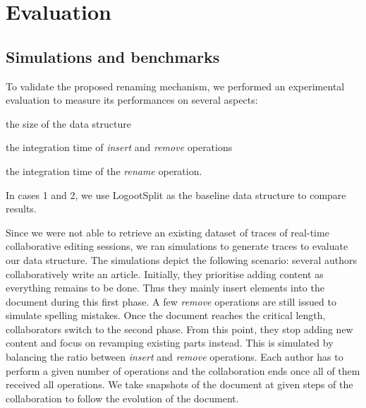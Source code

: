 \documentclass[sigplan,10pt]{acmart}
\begin{document}
\section{Evaluation}
\label{sec:evaluation}

\subsection{Simulations and benchmarks}

To validate the proposed renaming mechanism, we performed an experimental evaluation to measure its performances on several aspects:
\begin{enumerate*}
    \item the size of the data structure
    \item the integration time of \emph{insert} and \emph{remove} operations
    \item the integration time of the \emph{rename} operation.
\end{enumerate*}
In cases 1 and 2, we use LogootSplit as the baseline data structure to compare results.

Since we were not able to retrieve an existing dataset of traces of real-time collaborative editing sessions, we ran simulations to generate traces to evaluate our data structure.
The simulations depict the following scenario: several authors collaboratively write an article.
Initially, they prioritise adding content as everything remains to be done.
Thus they mainly insert elements into the document during this first phase.
A few \emph{remove} operations are still issued to simulate spelling mistakes.
Once the document reaches the critical length, collaborators switch to the second phase.
From this point, they stop adding new content and focus on revamping existing parts instead.
This is simulated by balancing the ratio between \emph{insert} and \emph{remove} operations.
Each author has to perform a given number of operations and the collaboration ends once all of them received all operations.
We take snapshots of the document at given steps of the collaboration to follow the evolution of the document.
\end{document}
